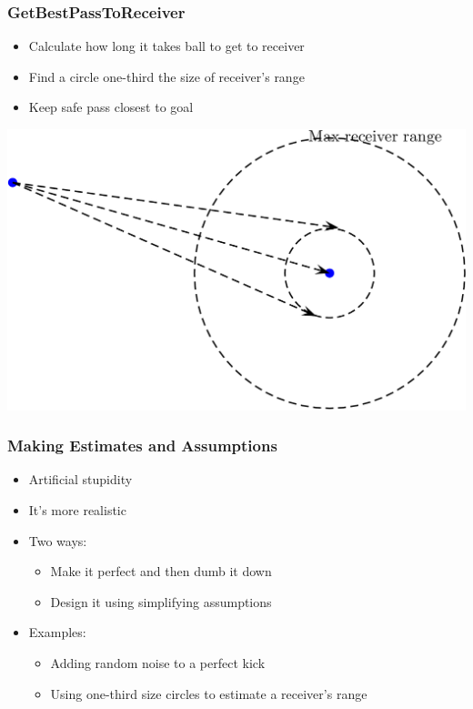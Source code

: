 \documentclass[handout,t,compress]{beamer}
\newcommand{\bframe}[1]{\begin{frame}[fragile]\frametitle{{#1}}}
\begin{document}
\bframe{GetBestPassToReceiver}
\begin{itemize}
\item Calculate how long it takes ball to get to receiver
\item Find a circle one-third the size of receiver's range
\item Keep safe pass closest to goal
\end{itemize}
\includegraphics[scale=0.25]{bestpass.png}
\end{frame}

\bframe{Making Estimates and Assumptions}
\begin{itemize}
\item Artificial stupidity
\item It's more realistic
\item Two ways:
\begin{itemize}
\item Make it perfect and then dumb it down
\item Design it using simplifying assumptions
\end{itemize}
\item Examples:
\begin{itemize}
\item Adding random noise to a perfect kick
\item Using one-third size circles to estimate a receiver's range
\end{itemize}
\end{itemize}
\end{frame}
\end{document}
